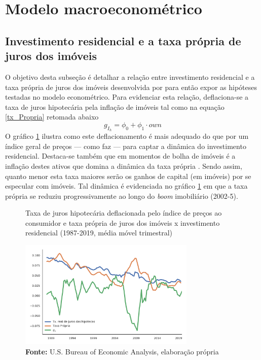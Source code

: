 \section{Modelo macroeconométrico}
\label{Modelo_empirico}

\subsection{Investimento residencial e a taxa própria de juros dos imóveis}
\label{SecTxPropria}

O objetivo desta subseção é detalhar a relação entre investimento residencial e a taxa própria de juros dos imóveis desenvolvida por \textcite{teixeira_crescimento_2015} para então expor as hipóteses testadas no modelo econométrico.
Para evidenciar esta relação, deflaciona-se a taxa de juros hipotecária pela inflação de imóveis tal como na equação \ref{tx_Propria} retomada abaixo
$$
g_{I_h} = \phi_0 + \phi_1\cdot own
$$
O gráfico \ref{gZ_Propria} ilustra como  este deflacionamento é mais adequado do que por um índice geral de preços ---  como faz \textcite[p.~143--146]{fair_macroeconometric_2013} --- para captar a dinâmica do investimento residencial.
Destaca-se também que em momentos de bolha de imóveis é a inflação destes ativos que domina a dinâmica da taxa própria \cite[p.~53]{teixeira_crescimento_2015}. Sendo assim, quanto menor esta taxa maiores serão os ganhos de capital (em imóveis) por se especular com imóveis.
Tal dinâmica é evidenciada no gráfico \ref{gZ_Propria} em que a taxa própria se reduziu progressivamente ao longo do \textit{boom} imobiliário (2002-5).




\begin{figure}[H]
	\centering
	\caption{Taxa de juros hipotecária deflacionada pelo índice de preços ao consumidor e taxa própria de juros dos imóveis x investimento residencial (1987-2019, média móvel trimestral)}
	\label{gZ_Propria}
	\includegraphics[width=0.75\textwidth]{../../Dados/Fatos_Estilizados/figs/TxPropria_Investo.png}
	\caption*{\textbf{Fonte:} U.S. Bureau of Economic Analysis, elaboração própria}
\end{figure}


